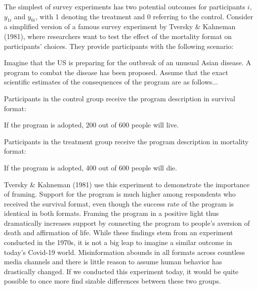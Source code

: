 \documentclass[12pt,econ]{sources/authesis}
\begin{document}
The simplest of survey experiments has two potential outcomes for participants \(i\), \(y_{1i}\) and \(y_{0i}\), with 1 denoting the treatment and 0 referring to the control. Consider a simplified version of a famous survey experiment by Tversky \& Kahneman (1981), where researchers want to test the effect of the mortality format on participants' choices. They provide participants with the following scenario:

\vspace{0.3cm}
\begin{adjustwidth}{50pt}{50pt}
\ssp
\noindent Imagine that the US is preparing for the outbreak of an unusual Asian disease. A program to combat the disease has been proposed. Assume that the exact scientific estimates of the consequences of the program are as follows...
\end{adjustwidth}
Participants in the control group receive the program description in survival format:

\vspace{0.3cm}
\begin{adjustwidth}{50pt}{50pt}
\ssp
\noindent If the program is adopted, 200 out of 600 people will live.
\end{adjustwidth}
Participants in the treatment group receive the program description in mortality format:

\vspace{0.3cm}
\begin{adjustwidth}{50pt}{50pt}
\ssp
\noindent If the program is adopted, 400 out of 600 people will die.
\end{adjustwidth}
Tversky \& Kahneman (1981) use this experiment to demonstrate the importance of framing. Support for the program is much higher among respondents who received the survival format, even though the success rate of the program is identical in both formats. Framing the program in a positive light thus dramatically increases support by connecting the program to people's aversion of death and affirmation of life. While these findings stem from an experiment conducted in the 1970s, it is not a big leap to imagine a similar outcome in today's Covid-19 world. Misinformation abounds in all formats across countless media channels and there is little reason to assume human behavior has drastically changed. If we conducted this experiment today, it would be quite possible to once more find sizable differences between these two groups.
\end{document}
